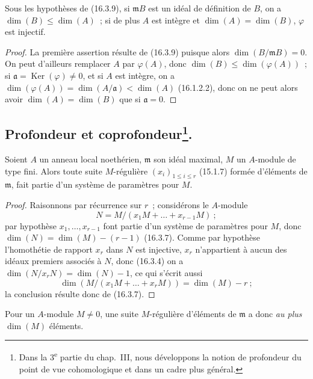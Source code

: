 \begin{corollary}[16.3.10]
\label{0.16.3.10-fr}
Sous les hypothèses de (16.3.9), si $\mathfrak{m}B$ est un idéal de définition
de $B$, on a $\dim(B)\leq\dim(A)$~; si de plus $A$ est intègre et
$\dim(A)=\dim(B)$, $\varphi$ est injectif.
\end{corollary}

\begin{proof}
La première assertion résulte de (16.3.9) puisque alors
$\dim(B/\mathfrak{m}B)=0$. On peut d'ailleurs remplacer $A$ par
$\varphi(A)$, donc $\dim(B)\leq\dim(\varphi(A))$~; si
$\mathfrak{a}=\operatorname{Ker}(\varphi)\neq0$, et si $A$ est intègre, on a
$\dim(\varphi(A))=\dim(A/\mathfrak{a})<\dim(A)$ (16.1.2.2), donc on ne peut
alors avoir $\dim(A)=\dim(B)$ que si $\mathfrak{a}=0$.
\end{proof}

\subsection[Profondeur et coprofondeur]{Profondeur et
coprofondeur\protect\footnote{Dans la 3\textsuperscript{e} partie du chap.~III, nous développons
la notion de profondeur du point de vue cohomologique et dans un cadre plus
général.}.}
\label{subsection:0.16.4-fr}

\begin{proposition}[16.4.1]
\label{0.16.4.1-fr}
Soient $A$ un anneau local noethérien, $\mathfrak{m}$ son idéal maximal, $M$ un
$A$-module de type fini. Alors toute suite $M$-régulière
$(x_i)_{1\leq i\leq r}$ (15.1.7) formée d'éléments de $\mathfrak{m}$, fait
partie d'un système de paramètres pour $M$.
\end{proposition}

\begin{proof}
Raisonnons par récurrence sur $r$~; considérons le $A$-module
\[
  N=M/(x_1M+\ldots+x_{r-1}M)~;
\]
par hypothèse $x_1,\ldots,x_{r-1}$ font partie d'un système de paramètres pour
$M$, donc $\dim(N)=\dim(M)-(r-1)$ (16.3.7). Comme par hypothèse l'homothétie
de rapport $x_r$ dans $N$ est injective, $x_r$ n'appartient à aucun des idéaux
premiers associés à $N$, donc (16.3.4) on a
$\dim(N/x_rN)=\dim(N)-1$, ce qui s'écrit aussi
\[
  \dim(M/(x_1M+\ldots+x_rM))=\dim(M)-r~;
\]
la conclusion résulte donc de (16.3.7).
\end{proof}

Pour un $A$-module $M\neq0$, une suite $M$-régulière d'éléments de
$\mathfrak{m}$ a donc \emph{au plus} $\dim(M)$ éléments.


